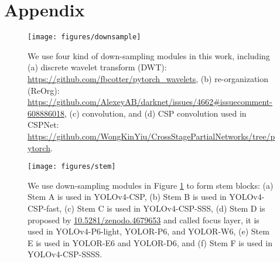 \documentclass[10pt,twocolumn,letterpaper]{article}
\begin{document}
\newpage

\appendix

\setcounter{table}{0}
\renewcommand{\thetable}{A\arabic{table}}

\setcounter{figure}{0}
\renewcommand{\thefigure}{A\arabic{figure}}

\section{Appendix}

\begin{figure}[h]
	\begin{center}
		\texttt{[image: figures/downsample]}
	\end{center}
	\caption{We use four kind of down-sampling modules in this work, including (a) discrete wavelet transform (DWT): \url{https://github.com/fbcotter/pytorch_wavelets}, (b) re-organization (ReOrg): \url{https://github.com/AlexeyAB/darknet/issues/4662\#issuecomment-608886018}, (c) convolution, and (d) CSP convolution used in CSPNet: \url{https://github.com/WongKinYiu/CrossStagePartialNetworks/tree/pytorch}.}
	\label{fig:down}
\end{figure}

\begin{figure}[h]
\begin{center}
	\texttt{[image: figures/stem]}
\end{center}
\caption{We use down-sampling modules in Figure \ref{fig:down} to form stem blocks: (a) Stem A is used in YOLOv4-CSP, (b) Stem B is used in YOLOv4-CSP-fast, (c) Stem C is used in YOLOv4-CSP-SSS, (d) Stem D is proposed by \url{10.5281/zenodo.4679653} and called focus layer, it is used in YOLOv4-P6-light, YOLOR-P6, and YOLOR-W6, (e) Stem E is used in YOLOR-E6 and YOLOR-D6, and (f) Stem F is used in YOLOv4-CSP-SSSS.}
\label{fig:stem}
\end{figure}
\end{document}

